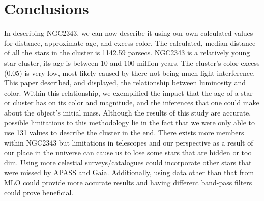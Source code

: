 \documentclass[linenumbers]{aastex631}
\begin{document}
\section{Conclusions}\label{conclusions}
In describing NGC2343, we can now describe it using our own calculated values for distance, approximate age, and excess color. The calculated, median distance of all the stars in the cluster is 1142.59 parsecs. NGC2343 is a relatively young star cluster, its age is between 10 and 100 million years. The cluster's color excess (0.05) is very low, most likely caused by there not being much light interference. This paper described, and displayed, the relationship between luminosity and color. Within this relationship, we exemplified the impact that the age of a star or cluster has on its color and magnitude, and the inferences that one could make about the object's initial mass. 
Although the results of this study are accurate, possible limitations to this methodology lie in the fact that we were only able to use 131 values to describe the cluster in the end. There exists more members within NGC2343 but limitations in telescopes and our perspective as a result of our place in the universe can cause us to lose some stars that are hidden or too dim. Using more celestial surveys/catalogues could incorporate other stars that were missed by APASS and Gaia. Additionally, using data other than that from MLO could provide more accurate results and having different band-pass filters could prove beneficial.


{}

\end{document}
